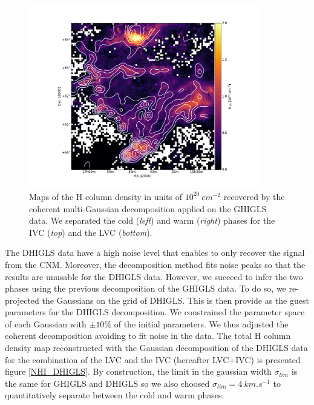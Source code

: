 \documentclass[traditabstract]{aa}
\begin{document}
\begin{figure}[h]
  \hspace{3mm}
  \includegraphics[page=5,height=8cm,trim=110 35 130 75,clip=true]{Figures/GHIGLS_NHI.pdf}
  \caption{\label{Phases_GHIGLS} Maps of the H column density in units of $10^{20}\: cm^{-2}$ recovered by the coherent multi-Gaussian decomposition applied on the GHIGLS data. We separated the cold (\emph{left}) and warm (\emph{right}) phases for the IVC (\emph{top}) and the LVC (\emph{bottom}).}
\end{figure}

   The DHIGLS data have a high noise level that enables to only recover the signal from the CNM. Moreover, the decomposition method fits noise peaks so that the results are unusable for the DHIGLS data. However, we succeed to infer the two phases using the previous decomposition of the GHIGLS data. To do so, we re-projected the Gaussians on the grid of DHIGLS. This is then provide as the guest parameters for the DHIGLS decomposition. We constrained the parameter space of each Gaussian with $\pm 10\%$ of the initial parameters.
We thus adjusted the coherent decomposition avoiding to fit noise in the data. The total H column density map reconstructed with the Gaussian decomposition of the DHIGLS data for the combination of the LVC and the IVC (hereafter LVC+IVC) is presented figure \ref{NHI_DHIGLS}. By construction, the limit in the gaussian width $\sigma_{lim}$ is the same for GHIGLS and DHIGLS so we also choosed $\sigma_{lim}=4\: km.s^{-1}$ to quantitatively separate between the cold and warm phases.
\end{document}
